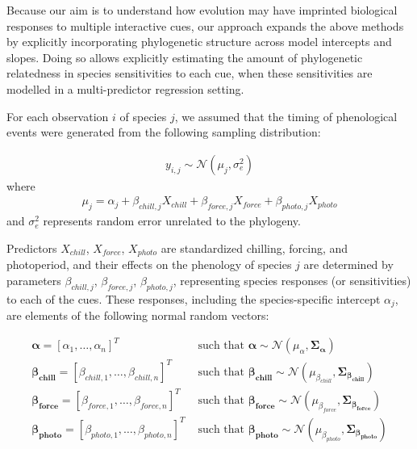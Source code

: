 \documentclass[11pt]{article}
\begin{document}
Because our aim is to understand how evolution may have imprinted biological responses to multiple interactive cues, our approach expands the above methods by explicitly incorporating phylogenetic structure across model intercepts and slopes. Doing so allows explicitly estimating the amount of phylogenetic relatedness in species sensitivities to each cue, when these sensitivities are modelled in a multi-predictor regression setting.  

For each observation $i$ of species $j$, we assumed that the timing of phenological events were generated from the following sampling distribution:

\begin{align}
  \label{modely}
  y_{i,j} \sim \mathcal{N}(\mu_j, \sigma_e^2)
\end{align}
where
\begin{align}
  \label{modelmu}
  \mu_j = \alpha_j + \beta_{chill,j} X_{chill} + \beta_{force,j} X_{force} + \beta_{photo,j} X_{photo}
\end{align}
and $\sigma_e^2$ represents random error unrelated to the phylogeny. 

Predictors $X_{chill}$, $X_{force}$, $X_{photo}$ are standardized chilling, forcing, and photoperiod, and their effects on the phenology of species $j$ are determined by parameters $\beta_{chill,j}$, $\beta_{force,j}$, $\beta_{photo,j}$, representing species responses (or sensitivities) to each of the cues. These responses, including the species-specific intercept $\alpha_j$, are elements of the following normal random vectors:

\begin{align}
    \label{phybetas}
  \boldsymbol{\alpha} = [\alpha_1, \ldots, \alpha_n]^T & \text{ such that }
  \boldsymbol{\alpha} \sim \mathcal{N}(\mu_{\alpha},\boldsymbol{\Sigma_{\alpha}}) \\
  \boldsymbol{\beta_{chill}} =  [\beta_{chill,1}, \ldots, \beta_{chill,n}]^T & \text{ such that }
  \boldsymbol{\beta_{chill}} \sim \mathcal{N}(\mu_{\beta_{chill}},\boldsymbol{\Sigma_{\beta_{chill}}}) \nonumber \\
  \boldsymbol{\beta_{force}} =  [\beta_{force,1}, \ldots, \beta_{force,n}]^T & \text{ such that }
  \boldsymbol{\beta_{force}} \sim \mathcal{N}(\mu_{\beta_{force}},\boldsymbol{\Sigma_{\beta_{force}}}) \nonumber \\
  \boldsymbol{\beta_{photo}} =  [\beta_{photo,1}, \ldots, \beta_{photo,n}]^T & \text{ such that }
  \boldsymbol{\beta_{photo}} \sim \mathcal{N}(\mu_{\beta_{photo}},\boldsymbol{\Sigma_{\beta_{photo}}}) \nonumber
\end{align}
\end{document}
